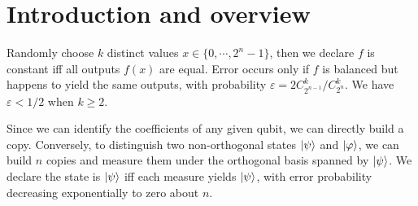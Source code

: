 \chapter{Introduction and overview}

\ex Randomly choose $k$ distinct values $x\in\{0,\cdots,2^n-1\}$, then we declare $f$ is constant iff all outputs $f(x)$ are equal.
Error occurs only if $f$ is balanced but happens to yield the same outputs, with probability $\varepsilon=2C_{2^{n-1}}^k/C_{2^n}^k$.
We have $\varepsilon<1/2$ when $k\ge 2$.

\ex Since we can identify the coefficients of any given qubit, we can directly build a copy.
Conversely, to distinguish two non-orthogonal states $\left|\psi\right\rangle$ and $\left|\varphi\right\rangle$, we can build $n$ copies and measure them under the orthogonal basis spanned by $\left|\psi\right\rangle$.
We declare the state is $\left|\psi\right\rangle$ iff each measure yields $\left|\psi\right\rangle$, with error probability decreasing exponentially to zero about $n$.

\prob \todo

\prob \todo
